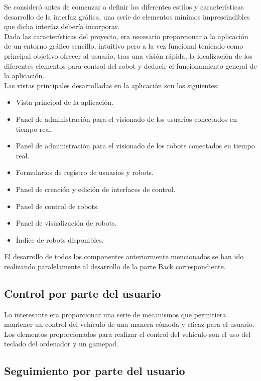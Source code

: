 \documentclass[a4paper,12pt]{article}
\begin{document}
Se consideró antes de comenzar a definir los diferentes estilos y características desarrollo de la interfaz gráfica, una serie de elementos mínimos imprescindibles que dicha interfaz debería incorporar.\\

Dada las características del proyecto, era necesario proporcionar a la aplicación de un entorno gráfico sencillo, intuitivo pero a la vez funcional teniendo como principal objetivo ofrecer al usuario, tras 
una visión rápida, la localización de los diferentes elementos para control del robot y deducir el funcionamiento general de la aplicación.\\

Las vistas principales desarrolladas en la aplicación son los siguientes:

\begin{itemize}
 \item Vista principal de la aplicación.
 \item Panel de administración para el visionado de los usuarios conectados en tiempo real.
 \item Panel de administración para el visionado de los robots conectados en tiempo real.
 \item Formularios de registro de usuarios y robots.
 \item Panel de creación y edición de interfaces de control.
 \item Panel de control de robots.
 \item Panel de visualización de robots.
 \item Índice de robots disponibles.
\end{itemize}

El desarrollo de todos los componentes anteriormente mencionados se han ido realizando paralelamente al desarrollo de la parte Back correspondiente.\\


\subsection{Control por parte del usuario}

Lo interesante era proporcionar una serie de mecanismos que permitiera mantener un control del vehículo de una manera cómoda y eficaz para el usuario. Los elementos proporcionados para realizar el control del vehículo son el uso del teclado del ordenador y un gamepad.

\subsection{ Seguimiento por parte del usuario}
\end{document}

